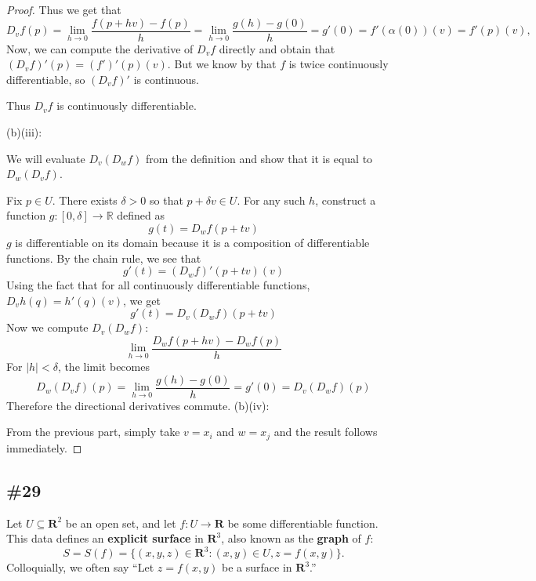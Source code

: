 \documentclass{article}
\newcommand{\R}{\mathbf{R}}
\theoremstyle{plain} %
\numberwithin{thm}{section} %
\theoremstyle{definition}
\begin{document}
\begin{proof}
            Thus we get that
            \[
                D_v f(p) = \lim_{h \to 0} \frac{f(p + hv) - f(p)}{h} = \lim_{h \to 0} \frac{g(h) - g(0)}{h} = g'(0) = f'(\alpha (0))(v) = f'(p)(v),
            \]
            Now, we can compute the derivative of \(D_{v} f\) directly and obtain that \((D_v f)'(p) = (f')'(p)(v)\). But we know by that \(f\) is twice continuously differentiable, so \((D_v f)'\) is continuous.

            Thus \(D_v f\) is continuously differentiable.
            \medskip

            (b)(iii):

            We will evaluate \(D_v (D_w f)\) from the definition and show that it is equal to \(D_w (D_v f)\).

            Fix \(p \in U\). There exists \(\delta > 0\) so that \(p + \delta v \in U\). For any such \(h\), construct a function \(g : [0,\delta] \to \mathbb{R}\) defined as
            \[
                g(t) = D_w f(p + tv)
            \]
            \(g\) is differentiable on its domain because it is a composition of differentiable functions. By the chain rule, we see that
            \[
                g'(t) = (D_w f)'(p+tv)(v)
            \]
            Using the fact that for all continuously differentiable functions, \(D_v h (q) = h'(q)(v)\), we get
            \[
                g'(t) = D_v (D_w f) (p+tv)
            \]
            Now we compute \(D_v (D_w f)\):
            \[
                \lim_{h \to 0} \frac{D_w f(p+hv) - D_w f(p)}{h}
            \]
            For \(|h| < \delta\), the limit becomes
            \[
                D_w (D_v f) (p) = \lim_{h \to 0} \frac{g(h) - g(0)}{h} = g'(0) = D_v (D_w f) (p)
            \]
            Therefore the directional derivatives commute.
            \medbreak
            (b)(iv):

            From the previous part, simply take \(v = x_i\) and \(w = x_j\) and the result follows immediately.
        \end{proof}

        \subsection{\#29}

        Let $U\subseteq \R^2$ be an open set, and let $f:U\rightarrow \R$ be some differentiable function. This data defines an \textbf{explicit surface} in $\R^3$, also known as the \textbf{graph} of $f$:
        \[ S = S(f) = \{(x,y,z)\in \R^3 : (x,y)\in U, z=f(x,y)\}. \]
        Colloquially, we often say ``Let $z=f(x,y)$ be a surface in $\R^3$.''
        
\end{document}
